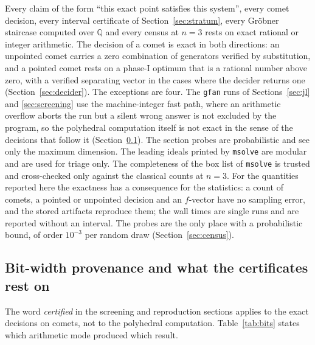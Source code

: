 \documentclass[11pt]{article}
\theoremstyle{definition}
\theoremstyle{remark}
\begin{document}
Every claim of the form ``this exact point satisfies this system'', every comet decision, every interval certificate of
Section~\ref{sec:stratum}, every Gr\"obner staircase computed over $\mathbb{Q}$ and every census at $n=3$ rests on exact rational or integer
arithmetic. The decision of a comet is exact in both directions: an unpointed comet carries a zero combination of generators verified by
substitution, and a pointed comet rests on a phase-I optimum that is a rational number above zero, with a verified separating vector in the
cases where the decider returns one (Section~\ref{sec:decider}). The exceptions are four. The \texttt{gfan} runs of Sections~\ref{sec:jl} and
\ref{sec:screening} use the machine-integer fast path, where an arithmetic overflow aborts the run but a silent wrong answer is not excluded by
the program, so the polyhedral computation itself is not exact in the sense of the decisions that follow it (Section~\ref{sec:validation}). The
section probes are probabilistic and see only the maximum dimension. The leading ideals printed by \texttt{msolve} are modular and are used for
triage only. The completeness of the box list of \texttt{msolve} is trusted and cross-checked only against the classical counts at $n=3$.
For the quantities reported here the exactness has a consequence for the statistics: a count of comets, a pointed or unpointed decision and an
$f$-vector have no sampling error, and the stored artifacts reproduce them; the wall times are single runs and are reported without an interval.
The probes are the only place with a probabilistic bound, of order $10^{-3}$ per random draw (Section~\ref{sec:census}).

\subsection{Bit-width provenance and what the certificates rest on}\label{sec:validation}

The word \emph{certified} in the screening and reproduction sections applies to the exact decisions
on comets, not to the polyhedral computation. Table~\ref{tab:bits} states which arithmetic mode produced
which result.
\end{document}
